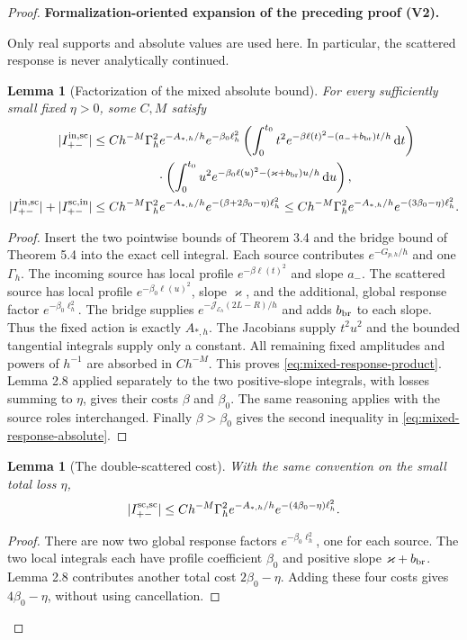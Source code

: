 \documentclass[11pt]{article}
\newtheorem{lemma}[theorem]{Lemma}
\newcommand{\formalisationparentid}{X}
\newenvironment{formalisationaddition}[1]{\par\medskip\begingroup\color{blue}\def\formalisationparentid{#1}\setcounter{formalizationsublemma}{0}\let\lemma\formalizationsublemma\let\endlemma\endformalizationsublemma
  \def\Eo{\mathcal E_h^\circ}\def\EE{\mathcal E_h}\def\phio{\phi_h^\circ}\def\phih{\phi_h}\def\Ho{H_h^{\rm atom}(v^\circ)}\def\Ha{H_h^{\rm atom}}\def\HL{H_h^{L}}\def\Dh{D_h}\def\Log{\operatorname{Log}}\def\ellh{\ell_h}\def\Gp{G_{p,h}}\def\Ast{A_{*,h}}\def\ahat{\widehat{\mathfrak a}_h}\def\ah{\mathfrak a_h}\def\rh{\widehat\rho_h}\def\deltah{\widehat\delta_h}\def\oldref##1{\textup{(##1)}}\def\interface##1{\par\noindent\textit{Analytical interface used here.} ##1\par}\def\finish{\par\noindent\textit{Conclusion of the formalization-oriented expansion.} }\par\noindent\textbf{Formalization-oriented expansion of the preceding proof (V2).}\par\smallskip
}{\par\endgroup\medskip
}
\newcommand{\cJ}{\mathcal J}
\begin{document}
\begin{proof}
\begin{formalisationaddition}{P6.8}
Only real supports and absolute values are used here. In particular, the scattered response is never analytically continued.

\begin{lemma}[Factorization of the mixed absolute bound]\label{sublemma:P6-8-mixed}
For every sufficiently small fixed $\eta>0$, some $C,M$ satisfy
\begin{align*}
 |I^{\rm in,sc}_{+-}|&\le Ch^{-M}\Gamma_h^2e^{-\Ast/h}e^{-\beta_0\ellh^2}
 \left(\int_0^{t_0}t^2e^{-\beta\ell(t)^2-(a_-+b_{\rm br})t/h}\,\mathrm dt\right)\notag\\
 &\hspace{18mm}\cdot
 \left(\int_0^{t_0}u^2e^{-\beta_0\ell(u)^2-(\varkappa+b_{\rm br})u/h}\,\mathrm du\right),\\
 |I^{\rm in,sc}_{+-}|+|I^{\rm sc,in}_{+-}|
 &\le Ch^{-M}\Gamma_h^2e^{-\Ast/h}
 e^{-(\beta+2\beta_0-\eta)\ellh^2}
 \le Ch^{-M}\Gamma_h^2e^{-\Ast/h}e^{-(3\beta_0-\eta)\ellh^2}.
\end{align*}
\end{lemma}
\begin{proof}
Insert the two pointwise bounds of Theorem 3.4 and the bridge bound of Theorem 5.4 into the exact cell integral. Each source contributes $e^{-\Gp/h}$ and one $\Gamma_h$. The incoming source has local profile $e^{-\beta\ell(t)^2}$ and slope $a_-$. The scattered source has local profile $e^{-\beta_0\ell(u)^2}$, slope $\varkappa$, and the additional, global response factor $e^{-\beta_0\ellh^2}$. The bridge supplies $e^{-\cJ_{\EE}(2L-R)/h}$ and adds $b_{\rm br}$ to each slope. Thus the fixed action is exactly $\Ast$. The Jacobians supply $t^2u^2$ and the bounded tangential integrals supply only a constant. All remaining fixed amplitudes and powers of $h^{-1}$ are absorbed in $Ch^{-M}$. This proves \eqref{eq:mixed-response-product}. Lemma 2.8 applied separately to the two positive-slope integrals, with losses summing to $\eta$, gives their costs $\beta$ and $\beta_0$. The same reasoning applies with the source roles interchanged. Finally $\beta>\beta_0$ gives the second inequality in \eqref{eq:mixed-response-absolute}.
\end{proof}

\begin{lemma}[The double-scattered cost]\label{sublemma:P6-8-double}
With the same convention on the small total loss $\eta$,
\begin{equation*}
 |I^{\rm sc,sc}_{+-}|\le Ch^{-M}\Gamma_h^2e^{-\Ast/h}
                 e^{-(4\beta_0-\eta)\ellh^2}.
\end{equation*}
\end{lemma}
\begin{proof}
There are now two global response factors $e^{-\beta_0\ellh^2}$, one for each source. The two local integrals each have profile coefficient $\beta_0$ and positive slope $\varkappa+b_{\rm br}$. Lemma 2.8 contributes another total cost $2\beta_0-\eta$. Adding these four costs gives $4\beta_0-\eta$, without using cancellation.
\end{proof}


\end{formalisationaddition}
\end{proof}
\end{document}
